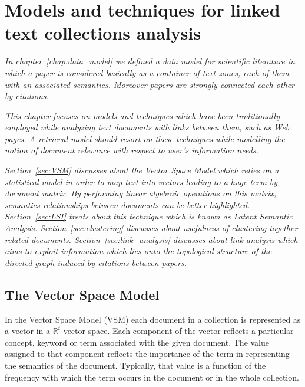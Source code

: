 \chapter{\label{chap:irmodels}Models and techniques for linked text collections analysis}

\textit{In chapter~\ref{chap:data_model} we defined a data model for scientific literature in which a paper is considered basically as a container of text zones, each of them with an associated semantics. Moreover papers are strongly connected each other by citations.}

\textit{This chapter focuses on models and techniques which have been traditionally employed while analyzing text documents with links between them, such as Web pages. A retrieval model should resort on these techniques while modelling the notion of document relevance with respect to user's information needs.}

\textit{Section~\ref{sec:VSM} discusses about the Vector Space Model which relies on a statistical model in order to map text into vectors leading to a huge term-by-document matrix. By performing linear algebraic operations on this matrix, semantics relationships between documents can be better highlighted. Section~\ref{sec:LSI} treats about this technique which is known as Latent Semantic Analysis. Section~\ref{sec:clustering} discusses about usefulness of clustering together related documents. Section~\ref{sec:link_analysis} discusses about link analysis which aims to exploit information which lies onto the topological structure of the directed graph induced by citations between papers.}

\section{\label{sec:VSM}The Vector Space Model}
In the Vector Space Model (VSM) \cite{berry1999mvs} each document in a collection is represented as a vector in a $\mathbb{R}^t$ vector space. Each component of the vector reflects a particular concept, keyword or term associated with the given document. The value assigned to that component reflects the importance of the term in representing the semantics of the document. Typically, that value is a function of the frequency with which the term occurs in the document or in the whole collection.

